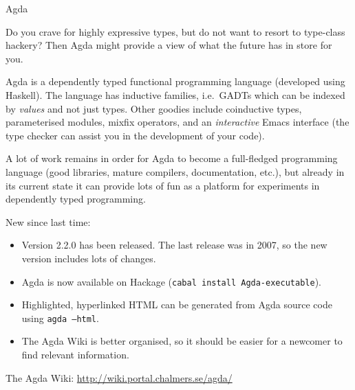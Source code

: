 \documentclass{article}
\begin{document}
\begin{hcarentry}[updated]{Agda}
\label{agda}
\makeheader

Do you crave for highly expressive types, but do not want to resort to
type-class hackery? Then Agda might provide a view of what the future
has in store for you.

Agda is a dependently typed functional programming language (developed
using Haskell). The language has inductive families, i.e.\ GADTs which
can be indexed by \emph{values} and not just types. Other goodies
include coinductive types, parameterised modules, mixfix operators,
and an \emph{interactive} Emacs interface (the type checker can assist
you in the development of your code).

A lot of work remains in order for Agda to become a full-fledged
programming language (good libraries, mature compilers, documentation,
etc.), but already in its current state it can provide lots of fun as
a platform for experiments in dependently typed programming.

New since last time:
\begin{itemize}
\item Version 2.2.0 has been released. The last release was in 2007,
  so the new version includes lots of changes.
\item Agda is now available on Hackage (\texttt{cabal install
    Agda-executable}).
\item Highlighted, hyperlinked HTML can be generated from Agda source
  code using \texttt{agda --html}.
\item The Agda Wiki is better organised, so it should be easier for a
  newcomer to find relevant information.
\end{itemize}

\FurtherReading
  The Agda Wiki: \url{http://wiki.portal.chalmers.se/agda/}
\end{hcarentry}
\end{document}
